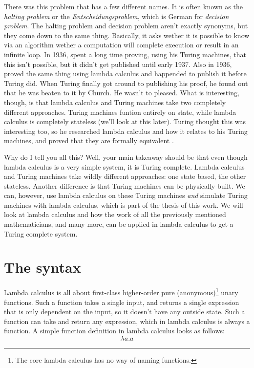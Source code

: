 \documentclass[11pt]{book}
\begin{document}
There was this problem that has a few different names. It is often known as the
\emph{halting problem} or the \emph{Entscheidungsproblem}, which is German for
\emph{decision problem}. The halting problem and decision problem aren't
exactly synonyms, but they come down to the same thing. Basically, it asks
wether it is possible to know via an algorithm wether a computation will
complete execution or result in an infinite loop. In 1936,
\textcite{turing1936, turing1937correction} spent a long time proving, using
his Turing machines, that this isn't possible, but it didn't get published
until early 1937. Also in 1936, \textcite{church1936} proved the same thing
using lambda calculus and happended to publish it before Turing did. When
Turing finally got around to publishing his proof, he found out that he was
beaten to it by Church. He wasn't to pleased. What is interesting, though, is
that lambda calculus and Turing machines take two completely different
approaches. Turing machines funtion entirely on state, while lambda calculus is
completely stateless (we'll look at this later). Turing thought this was
interesting too, so he researched lambda calculus and how it relates to his
Turing machines, and proved that they are formally equivalent
\parencite{turing1937computability}. 

Why do I tell you all this? Well, your main takeaway should be that even though
lambda calculus is a very simple system, it is Turing complete. Lambda calculus
and Turing machines take wildly different approaches: one state based, the
other stateless. Another difference is that Turing machines can be physically
built. We can, however, use lambda calculus on these Turing machines \emph{and}
simulate Turing machines with lambda calculus, which is part of the thesis of
this work. We will look at lambda calculus and how the work of all the
previously mentioned mathematicians, and many more, can be applied in lambda
calculus to get a Turing complete system.

\section{The syntax\label{syntax}}

Lambda calculus is all about first-class higher-order pure
(anonymous)\footnote{The core lambda calculus has no way of naming functions.}
unary functions. Such a function takes a single input, and returns a single
expression that is only dependent on the input, so it doesn't have any outside
state. Such a function can take and return any expression, which in lambda
calculus is always a function. A simple function definition in lambda calculus
looks as follows: \[\lambda a.a\]
\end{document}
